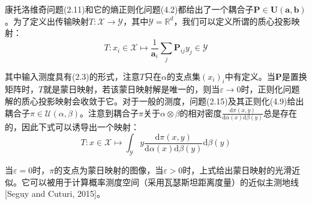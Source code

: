 \documentclass[cn,10pt,math=newtx,citestyle=gb7714-2015,bibstyle=gb7714-2015]{elegantbook}
\begin{document}
\begin{postulate}[质心投影]
康托洛维奇问题(2.11)和它的熵正则化问题(4.2)都给出了一个耦合子$\mathbf{P}\in\mathbf{U(a,b)}$。为了定义出传输映射$T:\mathcal{X}\to\mathcal{Y}$，其中$\mathcal{Y}=\mathbb{R}^d$，我们可以定义所谓的质心投影映射：
\begin{equation}
    \label{4.19}
    T:x_i\in\mathcal{X} \mapsto \frac{1}{\mathbf{a}_i}\sum_j \mathbf{P}_{ij}y_j \in \mathcal{Y}
\end{equation}

其中输入测度具有(2.3)的形式，注意$T$只在$\alpha$的支点集$(x_i)_i$中有定义。当$\mathbf{P}$是置换矩阵时，$T$就是蒙日映射，若该蒙日映射解是唯一的，则当$\varepsilon\to 0$时，正则化问题解的质心投影映射会收敛于它。对于一般的测度，问题(2.15)及其正则化(4.9)给出耦合子$\pi\in\mathcal{U}(\alpha,\beta)$。注意到耦合子$\pi$关于$\alpha\otimes \beta$的相对密度$\frac{\text{d}\pi(x,y)}{\text{d}\alpha(x)\text{d}\beta(y)}$总是存在的，因此下式可以诱导出一个映射：
\begin{equation}
    \label{4.20}
    T:x\in\mathcal{X} \mapsto \int_\mathcal{Y} y \frac{\text{d}\pi(x,y)}{\text{d}\alpha(x)\text{d}\beta(y)} \text{d}\beta(y)
\end{equation}

当$\varepsilon=0$时，$\pi$的支点为蒙日映射的图像，当$\varepsilon>0$时，上式给出蒙日映射的光滑近似。它可以被用于计算概率测度空间（采用瓦瑟斯坦距离度量）的近似主测地线[Seguy and Cuturi, 2015]。
\end{postulate}
\end{document}
